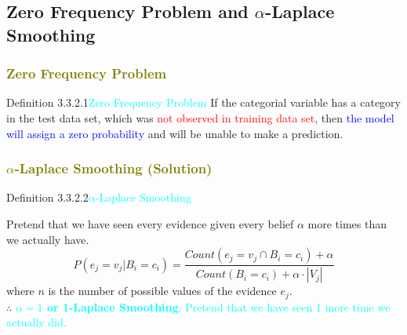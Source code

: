 \documentclass{book}
\begin{document}
\subsection{Zero Frequency Problem and \(\alpha\)-Laplace Smoothing}
\textcolor{olive}{\subsubsection{Zero Frequency Problem}}
\begin{defBox}{Definition 3.3.2.1}{\textcolor{cyan}{Zero Frequency Problem}}
If the categorial variable has a category in the test data set, which was \textcolor{red}{not observed in training data set}, then \textcolor{blue}{the model will assign a zero probability} and will be unable to make a prediction.
\end{defBox}
\textcolor{olive}{\subsubsection{\(\alpha\)-Laplace Smoothing (Solution)}}
\begin{defBox}{Definition 3.3.2.2}{\textcolor{cyan}{\(\alpha\)-Laplace Smoothing}}
\raggedright
Pretend that we have seen every evidence given every belief \(\alpha\) more times than we actually have.\\
\[
    P(e_j = v_j|B_i = c_i) = \frac{Count(e_j = v_j \cap B_i = c_i) + \alpha}{Count(B_i = c_i) + \alpha \cdot |V_j|}
\]
where \(n\) is the number of possible values of the evidence \(e_j\).\\
\vspace{1.5mm}
$\therefore$ \textcolor{cyan}{\textbf{\(\alpha = 1\) or 1-Laplace Smoothing}: Pretend that we have seen 1 more time we actually did.}
\end{defBox}
\newpage
\end{document}
